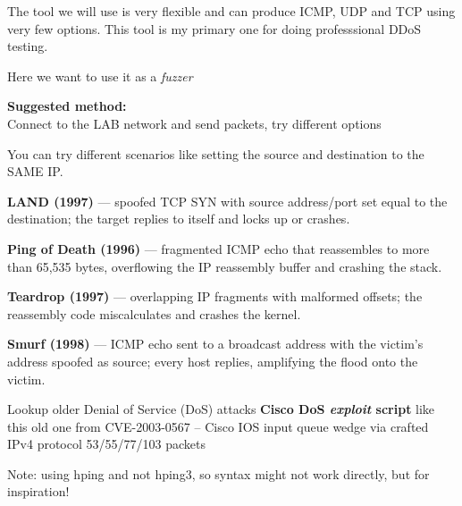 \documentclass[a4paper,11pt,notitlepage]{report}
\begin{document}
The tool we will use is very flexible and can produce ICMP, UDP and TCP using very few options. This tool is my primary one for doing professsional DDoS testing.

Here we want to use it as a \emph{fuzzer}

{\bf Suggested method:}\\
Connect to the LAB network and send packets, try different options

You can try different scenarios like setting the source and destination to the SAME IP.


\begin{list2}
\item \textbf{LAND (1997)} --- spoofed TCP SYN with source
      address/port set equal to the destination; the target
      replies to itself and locks up or crashes.
\item \textbf{Ping of Death (1996)} --- fragmented ICMP echo
      that reassembles to more than 65{,}535 bytes, overflowing
      the IP reassembly buffer and crashing the stack.
\item \textbf{Teardrop (1997)} --- overlapping IP fragments with
      malformed offsets; the reassembly code miscalculates and
      crashes the kernel.
\item \textbf{Smurf (1998)} --- ICMP echo sent to a broadcast
      address with the victim's address spoofed as source;
      every host replies, amplifying the flood onto the victim.
\end{list2}


Lookup older Denial of Service (DoS) attacks \textbf{Cisco DoS \emph{exploit} script} like this old one from
CVE-2003-0567 -- Cisco IOS input queue wedge via crafted IPv4 protocol 53/55/77/103 packets\\


Note: using hping and not hping3, so syntax might not work directly, but for inspiration!
\end{document}
